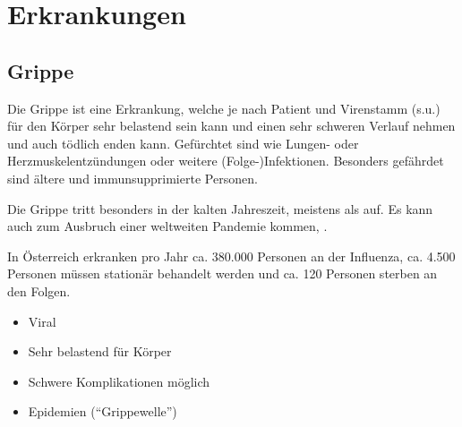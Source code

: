 \section{ Erkrankungen}


\subsection{Grippe}
\label{topic:grippe}
\label{topic:influenza}

\TextSlide{\TxBeschreibung}
{%
Die Grippe ist eine  Erkrankung, welche je nach
Patient und Virenstamm (s.u.) für den Körper sehr belastend
sein kann und einen sehr schweren Verlauf nehmen und auch
tödlich enden kann. Gefürchtet sind  wie
Lungen- oder Herzmuskelentzündungen oder weitere
(Folge-)Infektionen. Besonders gefährdet sind ältere und
immunsupprimierte Personen.

Die Grippe tritt besonders in der kalten Jahreszeit,
meistens als  auf. Es kann auch
zum Ausbruch einer weltweiten Pandemie
kommen, .

In Österreich erkranken pro Jahr ca. 380.000 Personen an der
Influenza, ca. 4.500 Personen müssen stationär behandelt werden und
ca. 120 Personen sterben an den
Folgen\cite{Strauss0000}.

}{
\begin{itemize}
  \item Viral
  \item Sehr belastend für Körper
  \item Schwere Komplikationen möglich
  \item Epidemien (\enquote{Grippewelle})
\end{itemize}
}{}{}{}

\begin{Synopsis}
\end{Synopsis}



